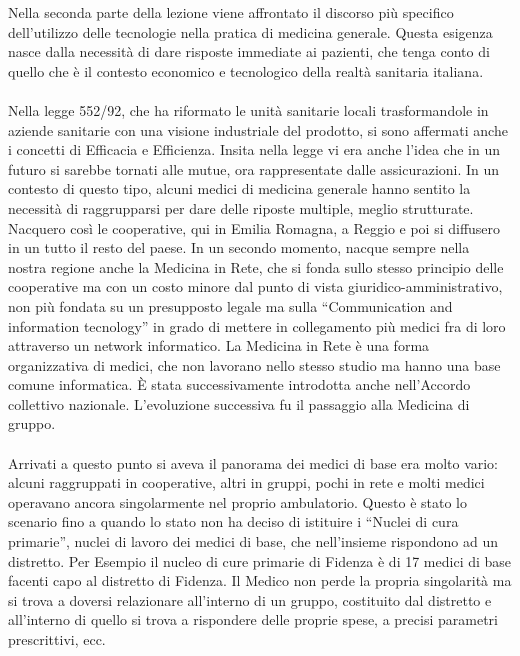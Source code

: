 Nella seconda parte della lezione viene affrontato il discorso più
specifico dell'utilizzo delle tecnologie nella pratica di medicina
generale. Questa esigenza nasce dalla necessità di dare risposte
immediate ai pazienti, che tenga conto di quello che è il contesto
economico e tecnologico della realtà sanitaria italiana.
\\\\
Nella legge 552/92, che ha riformato le unità sanitarie locali
trasformandole in aziende sanitarie con una visione industriale del
prodotto, si sono affermati anche i concetti di Efficacia e Efficienza.
Insita nella legge vi era anche l'idea che in un futuro si sarebbe
tornati alle mutue, ora rappresentate dalle assicurazioni. In un
contesto di questo tipo, alcuni medici di medicina generale hanno
sentito la necessità di raggrupparsi per dare delle riposte multiple,
meglio strutturate. Nacquero così le cooperative, qui in Emilia Romagna,
a Reggio e poi si diffusero in un tutto il resto del paese. In un
secondo momento, nacque sempre nella nostra regione anche la Medicina in
Rete, che si fonda sullo stesso principio delle cooperative ma con un
costo minore dal punto di vista giuridico-amministrativo, non più
fondata su un presupposto legale ma sulla ``Communication and
information tecnology'' in grado di mettere in collegamento più medici
fra di loro attraverso un network informatico. La Medicina in Rete è una
forma organizzativa di medici, che non lavorano nello stesso studio ma
hanno una base comune informatica. È stata successivamente introdotta
anche nell'Accordo collettivo nazionale. L'evoluzione successiva fu il
passaggio alla Medicina di gruppo.
\\\\
Arrivati a questo punto si aveva il panorama dei medici di base era
molto vario: alcuni raggruppati in cooperative, altri in gruppi, pochi
in rete e molti medici operavano ancora singolarmente nel proprio
ambulatorio. Questo è stato lo scenario fino a quando lo stato non ha
deciso di istituire i ``Nuclei di cura primarie'', nuclei di lavoro dei
medici di base, che nell'insieme rispondono ad un distretto. Per Esempio
il nucleo di cure primarie di Fidenza è di 17 medici di base facenti
capo al distretto di Fidenza. Il Medico non perde la propria singolarità
ma si trova a doversi relazionare all'interno di un gruppo, costituito
dal distretto e all'interno di quello si trova a rispondere delle
proprie spese, a precisi parametri prescrittivi, ecc.
\\\\
